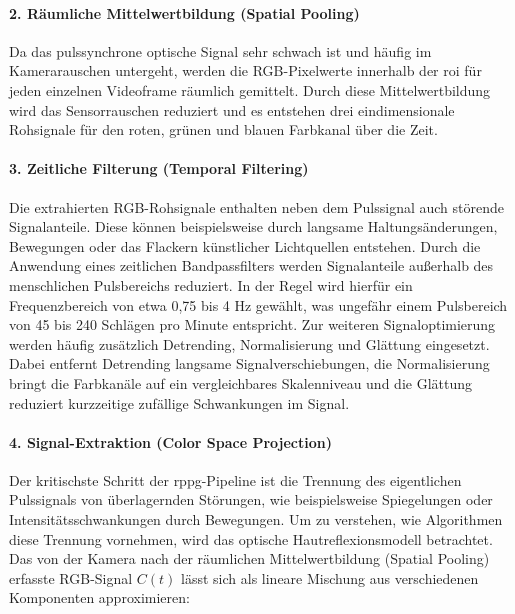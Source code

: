\paragraph{2. Räumliche Mittelwertbildung (Spatial Pooling)}
Da das pulssynchrone optische Signal sehr schwach ist und häufig im Kamerarauschen untergeht, werden die RGB-Pixelwerte innerhalb der \ac{roi} für jeden einzelnen Videoframe räumlich gemittelt. Durch diese Mittelwertbildung wird das Sensorrauschen reduziert und es entstehen drei eindimensionale Rohsignale für den roten, grünen und blauen Farbkanal über die Zeit.

\paragraph{3. Zeitliche Filterung (Temporal Filtering)}
Die extrahierten RGB-Rohsignale enthalten neben dem Pulssignal auch störende Signalanteile. Diese können beispielsweise durch langsame Haltungsänderungen, Bewegungen oder das Flackern künstlicher Lichtquellen entstehen. Durch die Anwendung eines zeitlichen Bandpassfilters werden Signalanteile außerhalb des menschlichen Pulsbereichs reduziert. In der Regel wird hierfür ein Frequenzbereich von etwa 0,75 bis 4 Hz gewählt, was ungefähr einem Pulsbereich von 45 bis 240 Schlägen pro Minute entspricht. Zur weiteren Signaloptimierung werden häufig zusätzlich Detrending, Normalisierung und Glättung eingesetzt. Dabei entfernt Detrending langsame Signalverschiebungen, die Normalisierung bringt die Farbkanäle auf ein vergleichbares Skalenniveau und die Glättung reduziert kurzzeitige zufällige Schwankungen im Signal.

\paragraph{4. Signal-Extraktion (Color Space Projection)}
Der kritischste Schritt der \ac{rppg}-Pipeline ist die Trennung des eigentlichen Pulssignals von überlagernden Störungen, wie beispielsweise Spiegelungen oder Intensitätsschwankungen durch Bewegungen. Um zu verstehen, wie Algorithmen diese Trennung vornehmen, wird das optische Hautreflexionsmodell betrachtet. Das von der Kamera nach der räumlichen Mittelwertbildung (Spatial Pooling) erfasste RGB-Signal $C(t)$ lässt sich als lineare Mischung aus verschiedenen Komponenten approximieren:

